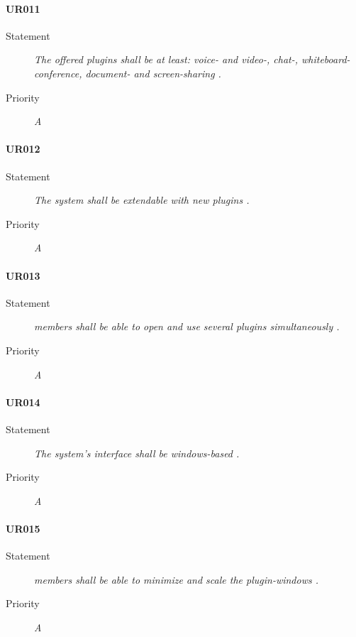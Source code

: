\paragraph{UR011}
  \begin{description}
  \item [Statement] 
    \textit{ The offered \gls{plugin}s shall be at least: voice- and video-, 
            chat-, whiteboard-\gls{conference}, document- and screen-sharing
    .}
  \item [Priority] \textit{A}
\end{description}
    
\paragraph{UR012}
  \begin{description}
  \item [Statement] 
    \textit{ The system shall be extendable with new \gls{plugin}s
    .}
  \item [Priority] \textit{A}
\end{description}
    
\paragraph{UR013}
  \begin{description}
  \item [Statement] 
    \textit{ \gls{member}s shall be able to open and use several \gls{plugin}s simultaneously
    .}
  \item [Priority] \textit{A}
\end{description}
    
\paragraph{UR014}
  \begin{description}
  \item [Statement] 
    \textit{ The system's interface shall be windows-based
    .}
  \item [Priority] \textit{A}
\end{description}
    
\paragraph{UR015}
  \begin{description}
  \item [Statement] 
    \textit{ \gls{member}s shall be able to minimize and scale the \gls{plugin}-windows
    .}
  \item [Priority] \textit{A}
\end{description}
    
